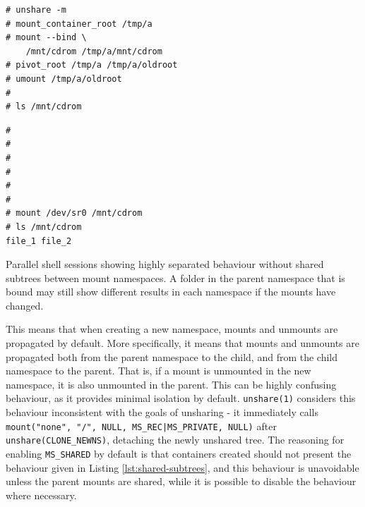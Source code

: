 \documentclass[12pt,a4paper,twoside]{report}
\begin{document}
\begin{listing}
\begin{minipage}{.49\textwidth}

\begin{verbatim}
# unshare -m
# mount_container_root /tmp/a
# mount --bind \
    /mnt/cdrom /tmp/a/mnt/cdrom
# pivot_root /tmp/a /tmp/a/oldroot
# umount /tmp/a/oldroot
#
# ls /mnt/cdrom

\end{verbatim}

\end{minipage}\hfill
\begin{minipage}{.49\textwidth}

\begin{verbatim}
#
#
#
#
#
#
# mount /dev/sr0 /mnt/cdrom
# ls /mnt/cdrom
file_1 file_2
\end{verbatim}

\end{minipage}

\caption{Parallel shell sessions showing highly separated behaviour without shared subtrees between mount namespaces. A folder in the parent namespace that is bound may still show different results in each namespace if the mounts have changed.}
\label{lst:shared-subtrees}
\end{listing}


This means that when creating a new namespace, mounts and unmounts are propagated by default. More specifically, it means that mounts and unmounts are propagated both from the parent namespace to the child, and from the child namespace to the parent. That is, if a mount is unmounted in the new namespace, it is also unmounted in the parent. This can be highly confusing behaviour, as it provides minimal isolation by default. \texttt{unshare(1)} considers this behaviour inconsistent with the goals of unsharing - it immediately calls \texttt{mount("none", "/", NULL, MS\_REC|MS\_PRIVATE, NULL)} after \texttt{unshare(CLONE\_NEWNS)}, detaching the newly unshared tree. The reasoning for enabling \texttt{MS\_SHARED} by default is that containers created should not present the behaviour given in Listing \ref{lst:shared-subtrees}, and this behaviour is unavoidable unless the parent mounts are shared, while it is possible to disable the behaviour where necessary.
\end{document}
